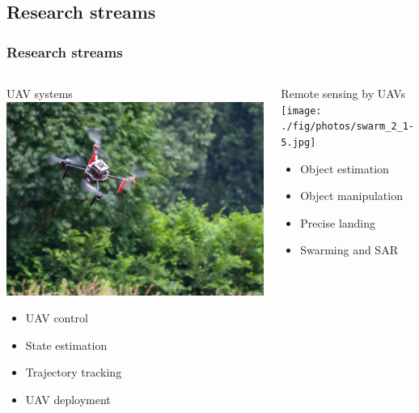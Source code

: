 \documentclass[aspectratio=169]{beamer}
\begin{document}

\subsection{Research streams}


\begin{frame}
\frametitle{Research streams}

\begin{columns}[c]


\begin{block}{UAV systems}
  \includegraphics[width=1.0\textwidth]{./fig/drona.jpg}
  \begin{itemize}
    \item UAV control
    \item State estimation
    \item Trajectory tracking
    \item UAV deployment
  \end{itemize}
\end{block}


\begin{block}{Remote sensing by UAVs}
  \texttt{[image: ./fig/photos/swarm\_2\_1-5.jpg]}
  \begin{itemize}
    \item Object estimation
    \item Object manipulation
    \item Precise landing
    \item Swarming and SAR
  \end{itemize}
\end{block}


\end{columns}
\end{frame}
\end{document}
